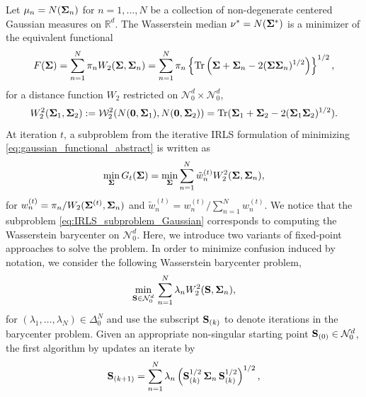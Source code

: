 \documentclass[11pt]{article}
\newcommand{\calN}{\mathcal{N}}
\newcommand{\calW}{\mathcal{W}}
\newcommand{\Rd}{\mathbb{R}^d}
\begin{document}
Let $\mu_n = N({\bf \Sigma}_n)$ for $n=1,\ldots,N$ be a collection of non-degenerate centered Gaussian measures on $\Rd$. The Wasserstein median $\nu^* = N({\bf \Sigma}^*)$ is a minimizer of the equivalent functional
\begin{equation}\label{eq:gaussian_functional_abstract}
	F({\bf \Sigma}) = \sum_{n=1}^N \pi_n W_2 ({\bf \Sigma}, {\bf \Sigma}_n) = \sum_{n=1}^N \pi_n \left\lbrace   \text{Tr} \left( {\bf \Sigma} + {\bf \Sigma}_n - 2 ({\bf \Sigma}{\bf \Sigma}_n)^{1/2}\right)\right\rbrace^{1/2},
\end{equation}
for a distance function $W_2$ restricted on $\calN_0^d\times \calN_0^d$,
\begin{equation*}
	W_2^2({\bf \Sigma}_1, {\bf \Sigma}_2) := \calW_2^2(N({\bf 0},{\bf \Sigma}_1), N({\bf 0},{\bf \Sigma}_2)) = \text{Tr}({\bf \Sigma}_1+{\bf \Sigma}_2-2({\bf \Sigma}_1{\bf \Sigma}_2)^{1/2}).
\end{equation*}
At iteration $t$, a subproblem from the iterative IRLS formulation of minimizing \eqref{eq:gaussian_functional_abstract} is written as 
\begin{equation}\label{eq:IRLS_subproblem_Gaussian}
	\min_{{\bf \Sigma}} G_t ({\bf \Sigma}) = \min_{{\bf \Sigma}} \sum_{n=1}^N \tilde{w}_n^{(t)} W_2^2 ({\bf \Sigma}, {\bf \Sigma}_n),
\end{equation}
for $w_n^{(t)} = \pi_n / W_2({\bf \Sigma}^{(t)}, {\bf \Sigma}_n)$ and $\tilde{w}_n^{(t)} = w_n^{(t)}/\sum_{n=1}^N w_n^{(t)}$. We notice that the subproblem \eqref{eq:IRLS_subproblem_Gaussian} corresponds to computing the Wasserstein barycenter on $\calN_0^d$. Here, we introduce two variants of fixed-point approaches to solve the problem. In order to minimize confusion induced by notation, we consider the following Wasserstein barycenter problem,
\begin{equation*}
	\underset{{\bf S} \in \calN_0^d}{\min}\, \sum_{n=1}^N \lambda_n W_2^2 ({\bf S}, {\bf \Sigma}_n),
\end{equation*}
for $(\lambda_1,\ldots,\lambda_N) \in \Delta_0^N$ and use the subscript ${\bf S}_{(k)}$ to denote iterations in the barycenter problem. Given an appropriate non-singular starting point ${\bf S}_{(0)} \in \calN_0^d$, the first algorithm by \cite{ruschendorf_2002_NCouplingProblem} updates an iterate by
\begin{equation}\label{eq:barycenter_ruschendorf}
	{\bf S}_{(k+1)} = \sum_{n=1}^N \lambda_n \left({\bf S}_{(k)}^{1/2} \, {\bf \Sigma}_n \, {\bf S}_{(k)}^{1/2}\right)^{1/2},
\end{equation}
\end{document}
